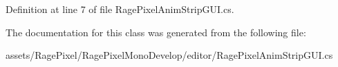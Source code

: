 Definition at line 7 of file Rage\-Pixel\-Anim\-Strip\-G\-U\-I.\-cs.



The documentation for this class was generated from the following file\-:\begin{DoxyCompactItemize}
\item 
assets/\-Rage\-Pixel/\-Rage\-Pixel\-Mono\-Develop/editor/Rage\-Pixel\-Anim\-Strip\-G\-U\-I.\-cs\end{DoxyCompactItemize}
